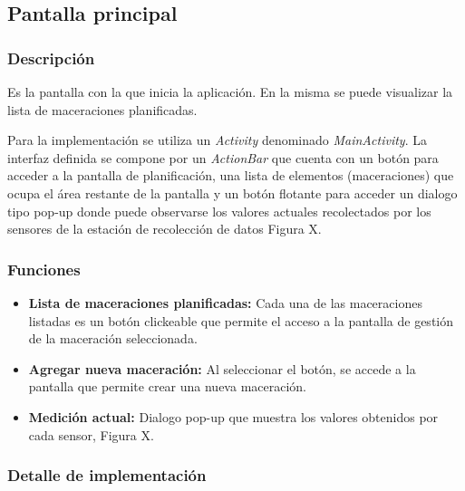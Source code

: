     \subsection{Pantalla principal}
        \label{DescripPantallaPrincipal}
        
            \subsubsection{Descripción}
                \par Es la pantalla con la que inicia la aplicación. En la misma se puede visualizar la lista de maceraciones planificadas.
                
                \par Para la implementación se utiliza un \textit{Activity} denominado \textit{MainActivity}. La interfaz definida se compone por un \textit{ActionBar} que cuenta con un botón para acceder a la pantalla de planificación, una lista de elementos (maceraciones) que ocupa el área restante de la pantalla y un botón flotante para acceder un dialogo tipo pop-up donde puede observarse los valores actuales recolectados por los sensores de la estación de recolección de datos Figura X. 
                
            \subsubsection{Funciones}
                \begin{itemize}
                    \item \textbf{Lista de maceraciones planificadas:} Cada una de las maceraciones listadas es un botón clickeable que permite el acceso a la pantalla de gestión de la maceración seleccionada.
                    
                    \item \textbf{Agregar nueva maceración:} Al seleccionar el botón, se accede a la pantalla que permite crear una nueva maceración.
                    
                    \item \textbf{Medición actual:} Dialogo pop-up que muestra los valores obtenidos por cada sensor, Figura X.
                \end{itemize}
                
            \subsubsection{Detalle de implementación}
                
